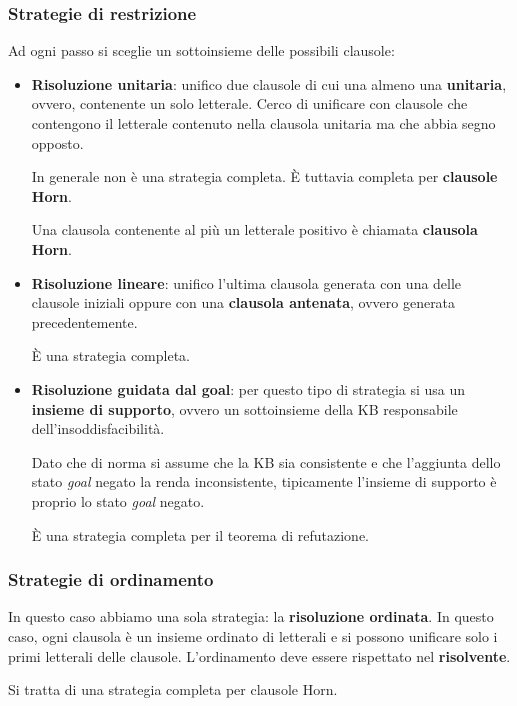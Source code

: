 \subsubsection{Strategie di restrizione}
Ad ogni passo si sceglie un sottoinsieme delle possibili clausole:
\begin{itemize}
	\item \textbf{Risoluzione unitaria}: unifico due clausole di cui una almeno una \textbf{unitaria}, ovvero,
	      contenente un solo letterale. Cerco di unificare con clausole che contengono il letterale contenuto
	      nella clausola unitaria ma che abbia segno opposto.

	      In generale non \`e una strategia completa. \`E tuttavia completa per \textbf{clausole Horn}.
	      \begin{definition}
		      Una clausola contenente al pi\`u un letterale positivo \`e chiamata \textbf{clausola Horn}.
	      \end{definition}
	\item \textbf{Risoluzione lineare}: unifico l'ultima clausola generata con una delle clausole iniziali oppure
	      con una \textbf{clausola antenata}, ovvero generata precedentemente.

	      \`E una strategia completa.
	\item \textbf{Risoluzione guidata dal goal}: per questo tipo di strategia si usa un \textbf{insieme di supporto},
	      ovvero un sottoinsieme della KB responsabile dell'insoddisfacibilit\`a.

	      Dato che di norma si assume che la KB sia consistente e che l'aggiunta dello stato \emph{goal} negato la
	      renda inconsistente, tipicamente l'insieme di supporto \`e proprio lo stato \emph{goal} negato.

	      \`E una strategia completa per il teorema di refutazione.
\end{itemize}

\subsubsection{Strategie di ordinamento}
In questo caso abbiamo una sola strategia: la \textbf{risoluzione ordinata}. In questo caso, ogni clausola \`e un insieme
ordinato di letterali e si possono unificare solo i primi letterali delle clausole. L'ordinamento deve essere rispettato
nel \textbf{risolvente}.

Si tratta di una strategia completa per clausole Horn.

